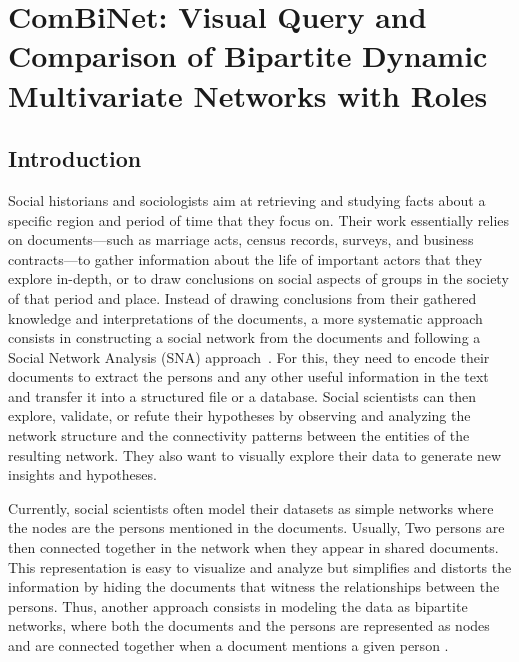 \chapter{ComBiNet: Visual Query and Comparison of Bipartite Dynamic Multivariate Networks with Roles}



\section{Introduction}

Social historians and sociologists aim at retrieving and studying facts about a specific region and period of time that they focus on. Their work essentially relies on documents---such as marriage acts, census records, surveys, and business contracts---to gather information about the life of important actors that they explore in-depth, or to draw conclusions on social aspects of groups in the society of that period and place. Instead of drawing conclusions from their gathered knowledge and interpretations of the documents, a more systematic approach consists in constructing a social network from the documents and following a Social Network Analysis (SNA) approach~\cite{wetherell_historical_1998}. For this, they need to encode their documents to extract the persons and any other useful information in the text and transfer it into a structured file or a database. Social scientists can then explore, validate, or refute their hypotheses by observing and analyzing the network structure and the connectivity patterns between the entities of the resulting network. They also want to visually explore their data to generate new insights and hypotheses.

Currently, social scientists often model their datasets as simple networks where the nodes are the persons mentioned in the documents. Usually, Two persons are then connected together in the network when they appear in shared documents.
This representation is easy to visualize and analyze but simplifies and distorts the information by hiding the documents that witness the relationships between the persons. Thus, another approach consists in modeling the data as bipartite networks, where both the documents and the persons are represented as nodes and are connected together when a document mentions a given person \cite{grandjean_analisi_2017, rossi_exploration_2014, shafie_hypergraph_2017}.

